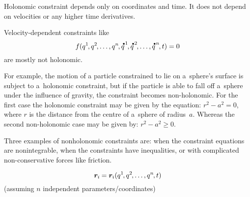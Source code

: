 Holonomic constraint depends only on coordinates and time.
It does not depend on velocities or any higher time derivatives.

Velocity-dependent constraints like
\[
f(q^{1} \hspace{-0.25ex}, q^{2} \hspace{-0.25ex}, \ldots, q^{n} \hspace{-0.25ex}, {\mathdotabove{q}}^{\hspace{.2ex}1} \hspace{-0.25ex}, {\mathdotabove{q}}^{\hspace{.2ex}2} \hspace{-0.25ex}, \ldots, {\mathdotabove{q}}^{\hspace{.2ex}n} \hspace{-0.25ex}, t) = 0
\]
are mostly not holonomic.

For example, the motion of a particle constrained to lie on a~sphere’s surface is subject to a~holonomic constraint, but if the particle is able to fall off a~sphere under the influence of gravity, the constraint becomes non-holonomic.
For the first case the holonomic constraint may be given by the equation: ${r^{2} - a^{2} = 0}$, where $r$ is the distance from the centre of a~sphere of radius~$a$.
Whereas the second non-holonomic case may be given by: ${r^{2} - a^{2} \geq 0}$.

Three examples of nonholonomic constraints are: when the constraint equations are nonintegrable, when the constraints have inequalities, or with complicated non-conservative forces like friction.

\[
\bm{r}_{i} \hspace{-0.1ex} = \bm{r}_{i}(q^{1} \hspace{-0.25ex}, q^{2} \hspace{-0.25ex}, \ldots, q^{n} \hspace{-0.25ex}, t)
\]
(assuming $n$ independent parameters/coordinates)



\label{para:virtualworkprinciple.genericmechanics}

